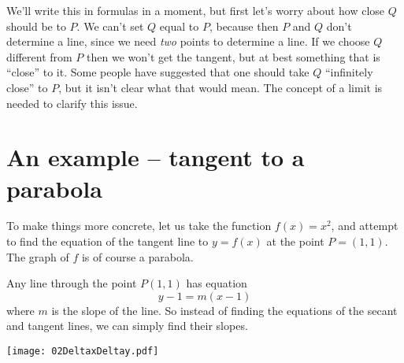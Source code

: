We'll write this in formulas in a moment, but first let's worry about
how close $Q$ should be to $P$.  We can't set $Q$ equal to $P$,
because then $P$ and $Q$ don't determine a line, since we need \emph{two}
points to determine a line.  If we choose $Q$ different from $P$
then we won't get the tangent, but at best something that is
``close'' to it.  Some people have suggested that one should take $Q$
``infinitely close'' to $P$, but it isn't clear what that would mean.
The concept of a limit is needed to clarify this issue.

\section{An example -- tangent to a parabola} 
\label{sec:tangent-to-parabola}
To make things more concrete, let us take the function $f(x)=x^2$, and attempt
to find the equation of the tangent line to $y=f(x)$ at the point $P=(1, 1)$.
The graph of $f$ is of course a parabola.

Any line through the point $P(1,1)$ has equation
\[
y-1 = m(x-1)
\]
where $m$ is the slope of the line.  So instead of finding the equations of the
secant and tangent lines, we can simply find their slopes.

\begin{center}
  \texttt{[image: 02DeltaxDeltay.pdf]}
\end{center}

